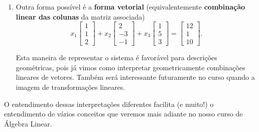 \documentclass[../livro.tex]{subfiles}  %
\begin{document}
\begin{example}
\begin{enumerate}[$(i)$]
\begin{equation}
\begin{array}{ccc|c}
\end{array}
\right].
\end{equation} Esta notação é boa para a resolução do sistema. Escalonando a matriz aumentada associada, conseguiremos dizer se o sistema possui solução (no caso em que uma linha da forma escalonada for contraditória), se o sistema possui apenas uma solução (quando todas as colunas referentes às variáveis do sistema possuem posição de pivô) ou então se existem infinitas soluções (caso sem linhas contraditórias em que existem colunas sem posição de pivô -- assocaidas com variáveis livres).
\item Outra forma possível é a \textbf{forma vetorial} (equivalentemente \textbf{combinação linear das colunas} da matriz associada)
\begin{equation}
x_1
\left[
\begin{array}{c}
1   \\
1  \\
2 
\end{array}
\right] + x_2 
\left[
\begin{array}{c}
  2   \\
 -3   \\
 -1
\end{array}
\right] + x_3 
\left[
\begin{array}{c}
 1  \\
 5  \\
 3
\end{array}
\right] = 
\left[
\begin{array}{c}
12   \\
1  \\
10
\end{array}
\right].
\end{equation} 

Esta maneira de representar o sistema é favorável para descrições geométricas, pois já vimos como interpretar geometricamente combinações lineares de vetores. Também será interessante futuramente no curso quando a imagem de transformações lineares.
\end{enumerate}  O entendimento dessas interpretações diferentes facilita (e muito!) o entendimento de vários conceitos que veremos mais adiante no nosso curso de Álgebra Linear.
\end{example}
\end{document}

